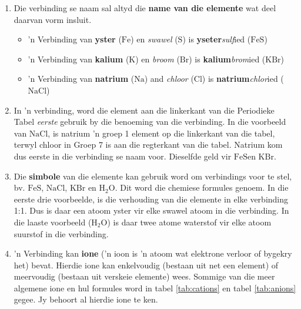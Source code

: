       \label{m38708*id64037}\begin{enumerate}[noitemsep, label=\textbf{\arabic*}. ] 
            \label{m38708*uid35}\item Die verbinding se naam sal altyd die \textbf{name van die elemente} wat deel daarvan vorm insluit.
\label{m38708*id64059}\begin{itemize}[noitemsep]
            \label{m38708*uid36}\item 'n Verbinding van \textbf{yster} ($\text{Fe}$) en \textsl{swawel} ($\text{S}$) is \textbf{yseter}\textsl{sulf}ied ($\text{FeS}$)
\label{m38708*uid37}\item 'n Verbinding van \textbf{kalium} ($\text{K}$) en \textsl{broom} ($\text{Br}$) is \textbf{kalium}\textsl{brom}ied ($\text{KBr}$)
\label{m38708*uid38}\item 'n Verbinding van \textbf{natrium} ($\text{Na}$) and \textsl{chloor} ($\text{Cl}$) is \textbf{natrium}\textsl{chlor}ied ($\text{NaCl}$)
\end{itemize}
        \label{m38708*uid39}\item In 'n verbinding, word die element aan die linkerkant van die Periodieke Tabel \textsl{eerste} gebruik by die benoeming van die verbinding. In die voorbeeld van $\text{NaCl}$, is natrium 'n groep 1 element op die linkerkant van die tabel, terwyl chloor in Groep 7 is aan die regterkant van die tabel. Natrium kom dus eerste in die verbinding se naam voor. Dieselfde geld vir $\text{FeS}$en $\text{KBr}$.
\label{m38708*uid40}\item Die \textbf{simbole} van die elemente kan gebruik word om verbindings voor te stel, bv. $\text{FeS}$, $\text{NaCl}$, $\text{KBr}$ en $\text{H}{}_{2}\text{O}$. Dit word die chemiese formules genoem. In die eerste drie voorbeelde, is die verhouding van die elemente in elke verbinding 1:1. Dus is daar een atoom yster vir elke swawel atoom in die verbinding. In die laaste voorbeeld ($\text{H}{}_{2}\text{O}$) is daar twee atome waterstof vir elke atoom suurstof in die verbinding.
\item 'n Verbinding kan \textbf{ione} ('n ioon is 'n atoom wat elektrone verloor of bygekry het) bevat. Hierdie ione kan enkelvoudig (bestaan uit net een element) of meervoudig (bestaan uit verskeie elemente) wees. Sommige van die meer algemene ione en hul formules word in tabel \ref{tab:cations} en tabel \ref{tab:anions} gegee. Jy behoort al hierdie ione te ken.



\end{enumerate}
